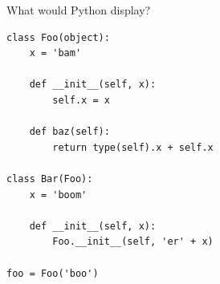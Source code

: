 \begin{blocksection}
\question What would Python display?

\begin{lstlisting}
class Foo(object):
    x = 'bam'

    def __init__(self, x):
        self.x = x

    def baz(self):
        return type(self).x + self.x

class Bar(Foo):
    x = 'boom'

    def __init__(self, x):
        Foo.__init__(self, 'er' + x)

foo = Foo('boo')
\end{lstlisting}
\end{blocksection}

\begin{parts}



\end{parts}
